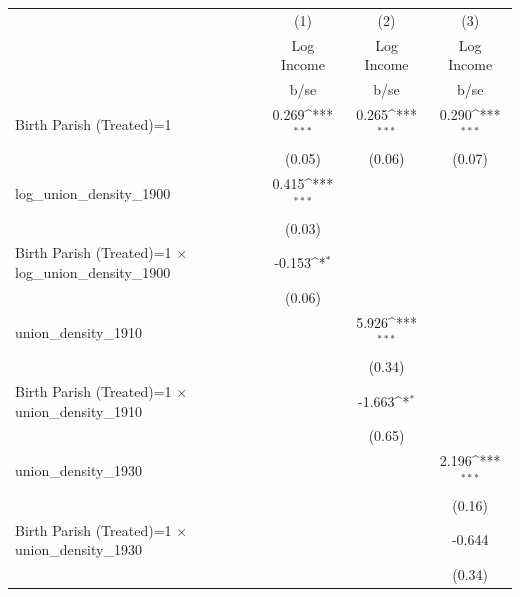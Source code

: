 {
\def\sym#1{\ifmmode^{#1}\else\(^{#1}\)\fi}
\begin{tabular}{l*{3}{c}}
\hline\hline
                    &\multicolumn{1}{c}{(1)}&\multicolumn{1}{c}{(2)}&\multicolumn{1}{c}{(3)}\\
                    &\multicolumn{1}{c}{Log Income}&\multicolumn{1}{c}{Log Income}&\multicolumn{1}{c}{Log Income}\\
                    &        b/se         &        b/se         &        b/se         \\
\hline
Birth Parish (Treated)=1&       0.269\sym{***}&       0.265\sym{***}&       0.290\sym{***}\\
                    &      (0.05)         &      (0.06)         &      (0.07)         \\
log\_union\_density\_1900&       0.415\sym{***}&                     &                     \\
                    &      (0.03)         &                     &                     \\
Birth Parish (Treated)=1 $\times$ log\_union\_density\_1900&      -0.153\sym{*}  &                     &                     \\
                    &      (0.06)         &                     &                     \\
union\_density\_1910  &                     &       5.926\sym{***}&                     \\
                    &                     &      (0.34)         &                     \\
Birth Parish (Treated)=1 $\times$ union\_density\_1910&                     &      -1.663\sym{*}  &                     \\
                    &                     &      (0.65)         &                     \\
union\_density\_1930  &                     &                     &       2.196\sym{***}\\
                    &                     &                     &      (0.16)         \\
Birth Parish (Treated)=1 $\times$ union\_density\_1930&                     &                     &      -0.644         \\
                    &                     &                     &      (0.34)         \\


\end{tabular}}
